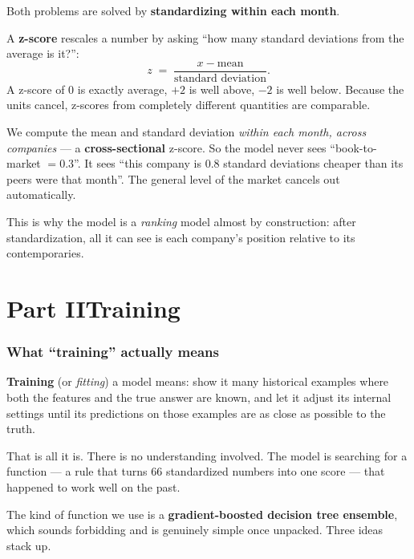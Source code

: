 \documentclass[11pt]{article}
\begin{document}
Both problems are solved by \textbf{standardizing within each month}.

\begin{specbox}
A \textbf{z-score} rescales a number by asking ``how many standard deviations from the
average is it?'':
\[
  z \;=\; \frac{x - \text{mean}}{\text{standard deviation}}.
\]
A z-score of $0$ is exactly average, $+2$ is well above, $-2$ is well below. Because
the units cancel, z-scores from completely different quantities are comparable.

We compute the mean and standard deviation \emph{within each month, across companies}
--- a \textbf{cross-sectional} z-score. So the model never sees ``book-to-market
$=0.3$''. It sees ``this company is $0.8$ standard deviations cheaper than its peers
were that month''. The general level of the market cancels out automatically.
\end{specbox}

This is why the model is a \emph{ranking} model almost by construction: after
standardization, all it can see is each company's position relative to its
contemporaries.

\part*{Part II\quad Training}

\section{What ``training'' actually means}

\textbf{Training} (or \emph{fitting}) a model means: show it many historical examples
where both the features and the true answer are known, and let it adjust its internal
settings until its predictions on those examples are as close as possible to the truth.

That is all it is. There is no understanding involved. The model is searching for a
function --- a rule that turns $66$ standardized numbers into one score --- that
happened to work well on the past.

The kind of function we use is a \textbf{gradient-boosted decision tree ensemble},
which sounds forbidding and is genuinely simple once unpacked. Three ideas stack up.
\end{document}
